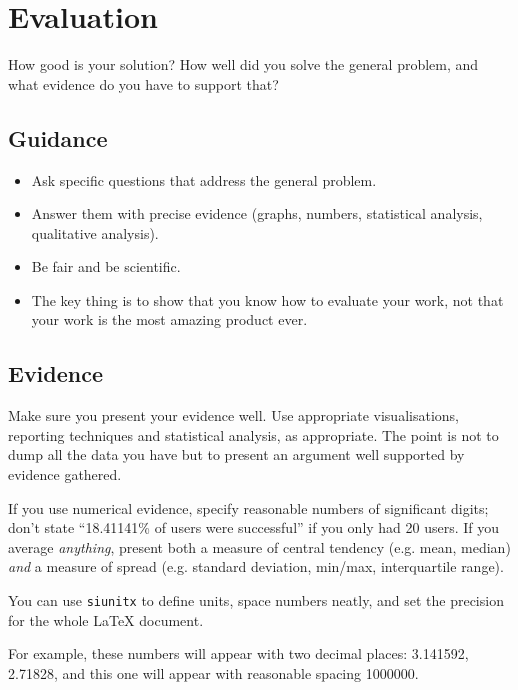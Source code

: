 \documentclass{l4proj}
\begin{document}
\chapter{Evaluation} 
How good is your solution? How well did you solve the general problem, and what evidence do you have to support that?

\section{Guidance}
\begin{itemize}
    \item
        Ask specific questions that address the general problem.
    \item
        Answer them with precise evidence (graphs, numbers, statistical
        analysis, qualitative analysis).
    \item
        Be fair and be scientific.
    \item
        The key thing is to show that you know how to evaluate your work, not
        that your work is the most amazing product ever.
\end{itemize}

\section{Evidence}
Make sure you present your evidence well. Use appropriate visualisations, 
reporting techniques and statistical analysis, as appropriate. The point is not
to dump all the data you have but to present an argument well supported by evidence gathered.

If you use numerical evidence, specify reasonable numbers of significant digits; don't state ``18.41141\% of users were successful'' if you only had 20 users. If you average \textit{anything}, present both a measure of central tendency (e.g. mean, median) \textit{and} a measure of spread (e.g. standard deviation, min/max, interquartile range).

You can use \texttt{siunitx} to define units, space numbers neatly, and set the precision for the whole LaTeX document. 


For example, these numbers will appear with two decimal places: \num{3.141592}, \num{2.71828}, and this one will appear with reasonable spacing \num{1000000}.
\end{document}
